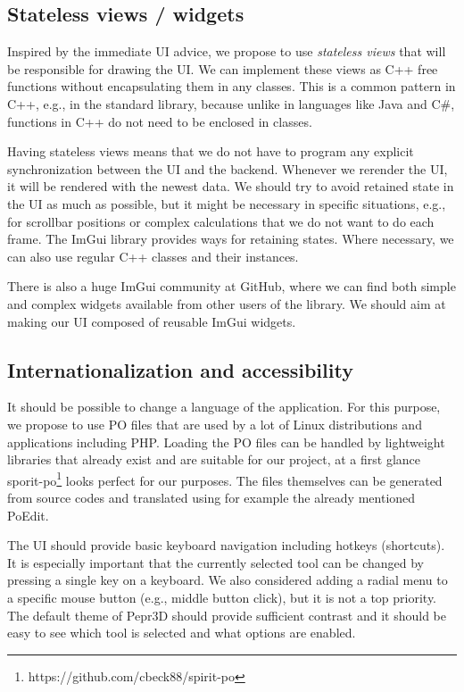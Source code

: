 \vspace{-1em}
\subsection{Stateless views / widgets}

Inspired by the immediate UI advice, we propose to use \emph{stateless views} that will be responsible for drawing the UI.
We can implement these views as C++ free functions without encapsulating them in any classes.
This is a common pattern in C++, e.g., in the standard library, because unlike in languages like Java and C\#, functions in C++ do not need to be enclosed in classes.

Having stateless views means that we do not have to program any explicit synchronization between the UI and the backend.
Whenever we rerender the UI, it will be rendered with the newest data.
We should try to avoid retained state in the UI as much as possible, but it might be necessary in specific situations, e.g., for scrollbar positions or complex calculations that we do not want to do each frame.
The ImGui library provides ways for retaining states.
Where necessary, we can also use regular C++ classes and their instances.

There is also a huge ImGui community at GitHub, where we can find both simple and complex widgets available from other users of the library.
We should aim at making our UI composed of reusable ImGui widgets.

\subsection{Internationalization and accessibility}

It should be possible to change a language of the application.
For this purpose, we propose to use PO files that are used by a lot of Linux distributions and applications including PHP.
Loading the PO files can be handled by lightweight libraries that already exist and are suitable for our project, at a first glance sporit-po\footnote{https://github.com/cbeck88/spirit-po} looks perfect for our purposes.
The files themselves can be generated from source codes and translated using for example the already mentioned PoEdit.

The UI should provide basic keyboard navigation including hotkeys (shortcuts).
It is especially important that the currently selected tool can be changed by pressing a single key on a keyboard.
We also considered adding a radial menu to a specific mouse button (e.g., middle button click), but it is not a top priority.
The default theme of Pepr3D should provide sufficient contrast and it should be easy to see which tool is selected and what options are enabled.
